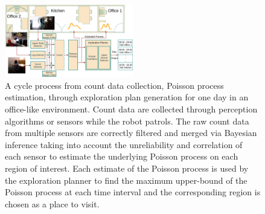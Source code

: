 \begin{figure}[t!]
	\centering
	\includegraphics[width=0.5\textwidth]{./figures/popp_exploration_process.jpeg}
	\caption{A cycle process from count data collection, Poisson process estimation, through exploration plan generation for one day in an office-like environment. Count data are collected through perception algorithms or sensors while the robot patrols. The raw count data from multiple sensors are correctly filtered and merged via Bayesian inference taking into account the unreliability and correlation of each sensor to estimate the underlying Poisson process on each region of interest. Each estimate of the Poisson process is used by the exploration planner to find the maximum upper-bound of the Poisson process at each time interval and the corresponding region is chosen as a place to visit.} 
	\label{fig:popp_exploration_process_diagram}
\end{figure}


